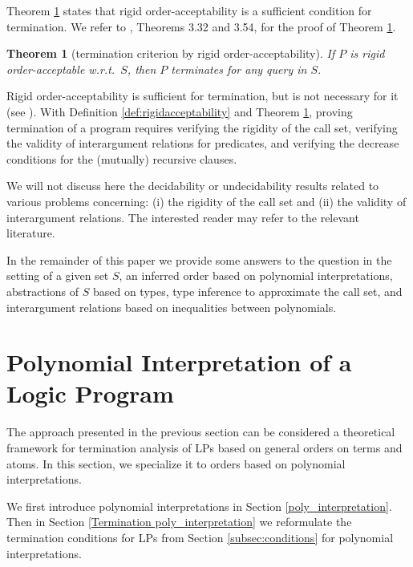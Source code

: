 \documentclass[envcountsame]{tlp}
\newtheorem{theorem}{Theorem}
\begin{document}
Theorem \ref{thm:rigidacceptability} states that 
rigid order-acceptability is a sufficient condition for termination. 
We refer to \cite{Serebrenik03}, Theorems 3.32 and 3.54, for the 
proof of Theorem \ref{thm:rigidacceptability}.


\begin{theorem}[termination criterion by rigid order-acceptability]
\label{thm:rigidacceptability} If $P$ is rigid
order-acceptable w.r.t.\ $S$, then $P$ terminates for any query in $S$.
\end{theorem}

Rigid order-acceptability is sufficient for
termination, but is not necessary for it (see
\cite{DeSchreyeSerebrenik01}). With Definition \ref{def:rigidacceptability}
and Theorem \ref{thm:rigidacceptability}, proving termination of a program
requires verifying the rigidity of the call set, verifying the validity of interargument
relations for predicates,  and verifying the decrease conditions for the (mutually)
recursive clauses. 

We will not discuss here the decidability or undecidability results
related to various problems concerning: (i) the rigidity of the call set
and (ii) the validity of interargument relations. The interested reader may refer
to the relevant literature.

In the remainder of this paper we provide some answers to the question in the setting of
a given set $S$, an inferred order based on polynomial interpretations, abstractions
of $S$ based on types, type inference to approximate the call set, and
interargument relations
based on inequalities between polynomials. 



\section{Polynomial Interpretation of a Logic Program}\label{sec:interpretation}


The approach presented in the previous section can be considered a theoretical
framework for termination analysis of LPs based on general
orders on terms and atoms. In this section, we specialize it to orders
based on polynomial interpretations. 

We first introduce polynomial interpretations in Section \ref{poly_interpretation}. Then in
Section \ref{Termination poly_interpretation} we reformulate the termination
conditions for LPs from Section \ref{subsec:conditions} for polynomial interpretations. 
\end{document}
